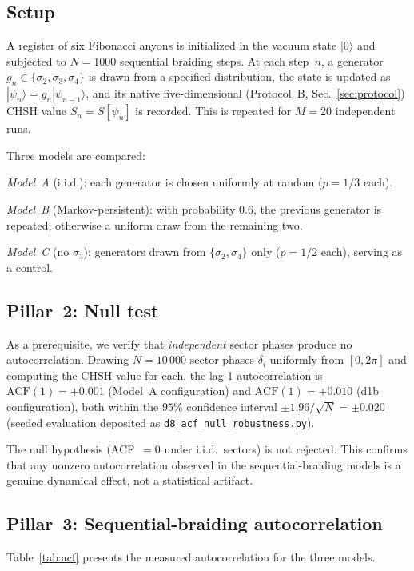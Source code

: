 \documentclass[aps,pra,twocolumn,superscriptaddress,longbibliography,floatfix,nofootinbib]{revtex4-2}
\begin{document}
\subsection{Setup}

A register of six Fibonacci anyons is initialized in the vacuum state
$|0\rangle$ and subjected to $N=1000$ sequential braiding steps.
At each step~$n$, a generator $g_n\in\{\sigma_2,\sigma_3,\sigma_4\}$
is drawn from a specified distribution, the state is updated as
$|\psi_n\rangle = g_n|\psi_{n-1}\rangle$, and its native
five-dimensional (Protocol~B, Sec.~\ref{sec:protocol}) CHSH value
$S_n = S[\psi_n]$ is recorded.
This is repeated for $M=20$ independent runs.

Three models are compared:

\emph{Model~A} (i.i.d.):
each generator is chosen uniformly at random ($p=1/3$ each).

\emph{Model~B} (Markov-persistent):
with probability $0.6$, the previous generator is repeated;
otherwise a uniform draw from the remaining two.

\emph{Model~C} (no $\sigma_3$):
generators drawn from $\{\sigma_2,\sigma_4\}$ only ($p=1/2$ each),
serving as a control.

\subsection{Pillar~2: Null test}

As a prerequisite, we verify that \emph{independent} sector phases
produce no autocorrelation.
Drawing $N=10\,000$ sector phases $\delta_i$
uniformly from $[0,2\pi]$ and computing the CHSH value for each,
the lag-1 autocorrelation is
$\text{ACF}(1) = +0.001$ (Model~A configuration) and
$\text{ACF}(1) = +0.010$ (d1b configuration),
both within the $95\%$ confidence interval
$\pm 1.96/\sqrt{N} = \pm 0.020$
(seeded evaluation deposited as
\texttt{d8\_acf\_null\_robustness.py}).

The null hypothesis (ACF~$=0$ under i.i.d.\ sectors) is not
rejected.
This confirms that any nonzero autocorrelation observed in the
sequential-braiding models is a genuine dynamical effect, not
a statistical artifact.

\subsection{Pillar~3: Sequential-braiding autocorrelation}

Table~\ref{tab:acf} presents the measured autocorrelation for the
three models.
\end{document}
